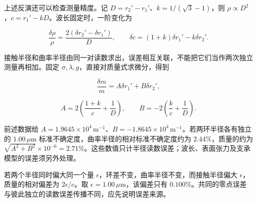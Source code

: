 \documentclass[12pt,a4paper,UTF8]{ctexart}
\begin{document}
上述反演还可以检查测量精度。记 \(D=r_2'-r_1'\)、\(k=1/(\sqrt3-1)\)，则
\(\rho\propto D^2\)，\(c=r_1'-kD\)。波长固定时，一阶变化为

\[\frac{\delta\rho}{\rho}=\frac{2(\delta r_2'-\delta r_1')}{D},\qquad \delta c=(1+k)\delta r_1'-k\delta r_2'.\]

接触半径和曲率半径由同一对读数求出，误差相互关联，不能把它们当作两次独立测量再相加。固定
\(\sigma,\lambda,g\)，直接对质量式求微分，得到

\[\frac{\delta m}{m}=A\delta r_1'+B\delta r_2',\]

\[A=2\left(\frac{1+k}{c}+\frac1D\right),\qquad B=-2\left(\frac{k}{c}+\frac1D\right).\]

前述数据给
\(A=1.9645\times10^4\,\mathrm{m^{-1}}\)、\(B=-1.8645\times10^4\,\mathrm{m^{-1}}\)。若两环半径各有独立的
\(1.00\,\mu\mathrm m\) 标准不确定度，曲率半径的相对标准不确定度约为
\(2.44\%\)，质量的约为
\(\sqrt{A^2+B^2}\times10^{-6}=2.71\%\)。这些数值只计半径读数误差；波长、表面张力及支承模型的误差须另外处理。

若两个半径同时偏大同一个量
\(\epsilon\)，环差不变，曲率半径不变，而接触半径偏大
\(\epsilon\)，质量的相对偏差为 \(2\epsilon/c\)。取
\(\epsilon=1.00\,\mu\mathrm m\)，该偏差只有
\(0.100\%\)。共同的零点误差与彼此独立的读数误差传播不同，应先说明误差来源。
\end{document}
